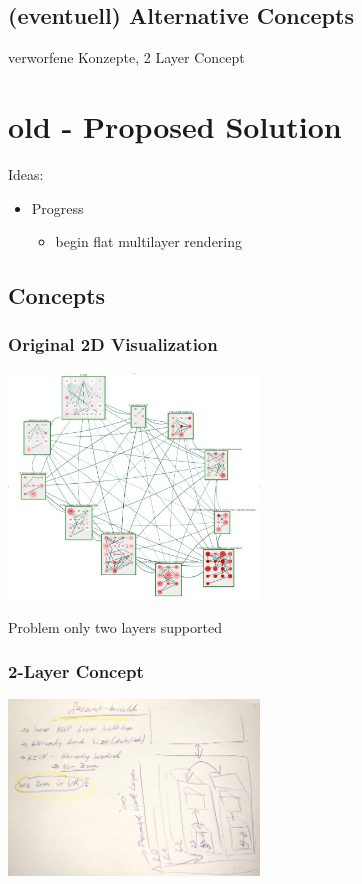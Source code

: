 \section{(eventuell) Alternative Concepts}

verworfene Konzepte, 2 Layer Concept\\

\chapter{old - Proposed Solution}
Ideas:
\begin{itemize}
    \item Progress
        \begin{itemize}
            \item begin flat multilayer rendering
        \end{itemize}
\end{itemize}

\section{Concepts}
\subsection{Original 2D Visualization}
\includegraphics[width=0.5\textwidth]{chapters/graphics/2dVisOfDemoData.jpg}

Problem only two layers supported

\subsection{2-Layer Concept}
\includegraphics[width=0.5\textwidth]{chapters/graphics/concept2.jpg}

